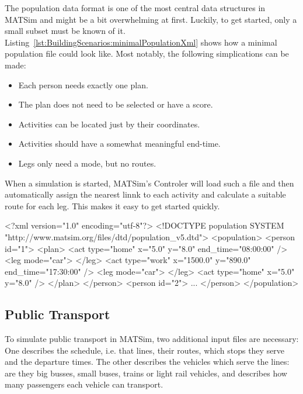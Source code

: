 \bigskip

The population data format is one of the most central data structures in
MATSim and might be a bit overwhelming at first. Luckily, to get started, only a
small subset must be known of it.
Listing~\ref{lst:BuildingScenarios:minimalPopulationXml} shows how a minimal
population file could look like. Most notably, the following simplications can
be made:
\begin{itemize}\styleItemize
  \item Each person needs exactly one plan.
  \item The plan does not need to be selected or have a score.
  \item Activities can be located just by their coordinates.
  \item Activities should have a somewhat meaningful end-time.
  \item Legs only need a mode, but no routes.
\end{itemize}
When a simulation is started, MATSim's Controler will load such a file and then
automatically assign the nearest linnk to each activity and calculate a suitable
route for each leg. This makes it easy to get started quickly.

\begin{xml-file}[caption=Minimal population.xml required to start MATSim,
label=lst:BuildingScenarios:minimalPopulationXml]
<?xml version="1.0" encoding="utf-8"?>
<!DOCTYPE population SYSTEM "http://www.matsim.org/files/dtd/population_v5.dtd">
<population>
	<person id="1">
		<plan>
			<act type="home" x="5.0" y="8.0" end_time="08:00:00" />
			<leg mode="car">
			</leg>
			<act type="work" x="1500.0" y="890.0" end_time="17:30:00" />
			<leg mode="car">
			</leg>
			<act type="home" x="5.0" y="8.0" />
		</plan>
	</person>
	<person id="2">
		...
	</person>
</population>
\end{xml-file}


\subsection{Public Transport}

To simulate public transport in MATSim, two additional input files are
necessary: One describes the schedule, i.e. that lines, their routes, which
stops they serve and the departure times. The other describes the vehicles which
serve the lines: are they big busses, small buses, trains or light rail
vehicles, and describes how many passengers each vehicle can transport.

